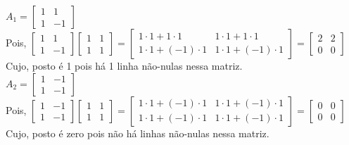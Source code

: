 \documentclass[leqno]{article}
\numberwithin{equation}{section}
\begin{document}
\begin{enumerate}
		\begin{sol} 
			$A_1 = 
			\begin{bmatrix}
			1 & 1 \\ 1 & -1 
			\end{bmatrix}$\\
			\newline
			Pois, 
			$\begin{bmatrix}
				1 & 1 \\
				1 & -1 
			\end{bmatrix}
			\begin{bmatrix}
				1 & 1 \\
				1 & 1 
			\end{bmatrix} = 
			\begin{bmatrix}
				1 \cdot 1 + 1 \cdot 1 & 1 \cdot 1 + 1 \cdot 1\\
				1 \cdot 1 + (-1) \cdot 1 & 1 \cdot 1 + (-1) \cdot 1  
			\end{bmatrix} =
			\begin{bmatrix}
				2 & 2\\
				0 & 0  
			\end{bmatrix}$\\
			\newline
			Cujo, posto é 1 pois há 1 linha não-nulas nessa matriz.\\
			\newline
			$A_2 =  
			\begin{bmatrix}
			1 & -1 \\ 1 & -1 
			\end{bmatrix}$\\
			\newline
			Pois, 
			$
			\begin{bmatrix}
			1 & -1 \\
			1 & -1 
			\end{bmatrix}
			\begin{bmatrix}
			1 & 1 \\
			1 & 1 
			\end{bmatrix} = 
			\begin{bmatrix}
			1 \cdot 1 + (-1) \cdot 1 & 1 \cdot 1 + (-1) \cdot 1\\
			1 \cdot 1 + (-1) \cdot 1 & 1 \cdot 1 + (-1) \cdot 1  
			\end{bmatrix} =
			\begin{bmatrix}
				0 & 0\\
				0 & 0  
			\end{bmatrix}
			$\\
			\newline
			Cujo, posto é zero pois não há linhas não-nulas nessa matriz.
			\newline
		\end{sol} 
		

\end{enumerate}
\end{document}
